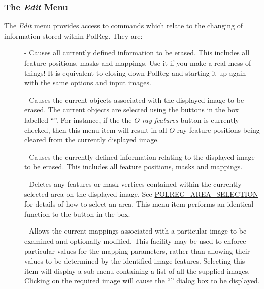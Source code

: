 \subsubsection {The {\em Edit} Menu}
The {\em Edit} menu provides access to commands which relate to
the changing of information stored within PolReg. They are:

\begin{description}

\item [] - Causes all currently defined information to be
erased. This includes all feature positions, masks and mappings. Use it
if you make a real mess of things! It is equivalent to closing down PolReg 
and starting it up again with the same options and input images.

\item [] - Causes the
current objects associated with the displayed image to be erased. The
current objects are selected using the buttons in the box labelled
``''. For instance, if the the
{\em $O$-ray features} button is currently checked, then this menu item
will result in all $O$-ray feature positions being cleared from the
currently displayed image.

\item [] - Causes the
currently defined information relating to the displayed image to be
erased. This includes all feature positions, masks and mappings.

\item [] - Deletes any features
or mask vertices contained within the currently selected area on the
displayed image. See \hyperref{here}{section }{}{POLREG_AREA_SELECTION}
for details of how to select an area. This menu item performs an
identical function to the  button in
the  box.

\item [] - Allows the current
mappings associated with a particular image to be examined and optionally
modified. This facility may be used to enforce particular values for the
mapping parameters, rather than allowing their values to be determined by
the identified image features. Selecting this item will display a sub-menu containing a list of all the supplied
images. Clicking on the required image will cause the ``'' dialog box to be displayed.

\end{description}

